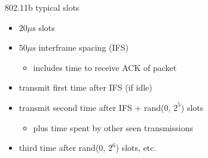 \begin{frame}{802.11b typical slots}
    \begin{itemize}
    \item $20 \mu\text{s}$ slots
    \item $50 \mu\text{s}$ interframe spacing (IFS)
        \begin{itemize}
        \item includes time to receive ACK of packet
        \end{itemize}
    \vspace{.5cm}
    \item transmit first time after IFS (if idle)
    \item transmit second time after IFS + rand($0$, $2^5$) slots
        \begin{itemize}
        \item plus time spent by other seen transmissions
        \end{itemize}
    \item third time after rand($0$, $2^6$) slots, etc.
    \end{itemize}
\end{frame}
